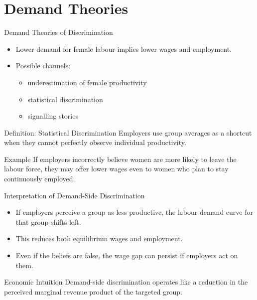 \documentclass[aspectratio=169]{beamer}
\begin{document}
\section{Demand Theories}

\begin{frame}{Demand Theories of Discrimination}
\transfade
\begin{itemize}
  \item Lower demand for female labour implies lower wages and employment.
  \item Possible channels:
  \begin{itemize}
    \item underestimation of female productivity
    \item statistical discrimination
    \item signalling stories
  \end{itemize}
\end{itemize}

\begin{block}{Definition: Statistical Discrimination}
Employers use group averages as a shortcut when they cannot perfectly observe individual productivity.
\end{block}

\begin{exampleblock}{Example}
If employers incorrectly believe women are more likely to leave the labour force, they may offer lower wages even to women who plan to stay continuously employed.
\end{exampleblock}
\end{frame}

\begin{frame}{Interpretation of Demand-Side Discrimination}
\transfade
\begin{itemize}
  \item If employers perceive a group as less productive, the labour demand curve for that group shifts left.
  \item This reduces both equilibrium wages and employment.
  \item Even if the beliefs are false, the wage gap can persist if employers act on them.
\end{itemize}

\begin{block}{Economic Intuition}
Demand-side discrimination operates like a reduction in the perceived marginal revenue product of the targeted group.
\end{block}
\end{frame}
\end{document}
